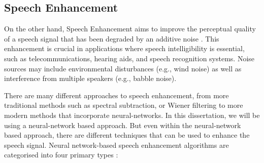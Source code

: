 \documentclass[logo,bsc,singlespacing,parskip,online]{infthesis}
\begin{document}

\subsection{Speech Enhancement}
On the other hand, Speech Enhancement aims to improve the perceptual quality of a speech signal that 
has been degraded by an additive noise \citep{loizou_speech_2007}. 
This enhancement is crucial in applications where speech intelligibility is essential, such as telecommunications, hearing aids, and speech recognition systems. Noise sources may include environmental disturbances (e.g., wind noise) as well as interference from multiple speakers (e.g., babble noise).

There are many different approaches to speech enhancement, from more traditional methods such as spectral subtraction, or Wiener filtering
to more modern methods that incorporate neural-networks. In this dissertation, we will be using a neural-network based approach.
But even within the neural-network based approach, there are different techniques that can be used to enhance the speech signal. 
Neural network-based speech enhancement algorithms are categorised into four primary types \cite{katagiri_handbook_2000}:
\label{sec:se-methods}
\end{document}
